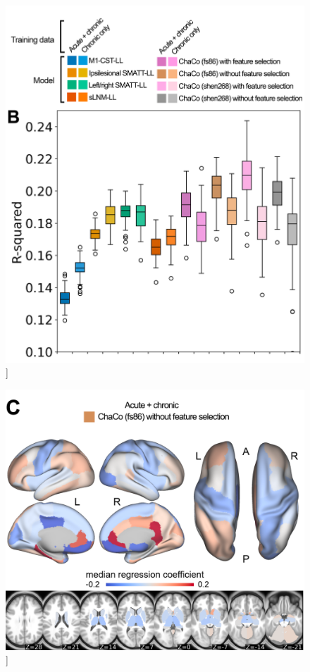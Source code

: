 \documentclass[phd,tocprelim]{cornell}
\renewcommand{\caption}[1]{\singlespacing\hangcaption{#1}\normalspacing}
\begin{document}
\begin{figure}[h!]
		\ContinuedFloat
		\captionsetup{labelformat=adja-page}
    \centering
    \includegraphics[width=1\textwidth]{chapter3/Figure1B.png}
    \caption[]{}
\end{figure}
\null
\vfill
\clearpage
\null
\vfill
\begin{figure}[h!]
		\ContinuedFloat
		\captionsetup{labelformat=adja-page}
    \centering
    \includegraphics[width=1\textwidth]{chapter3/Figure1C.png}
    \caption[]{}
\end{figure}
\end{document}
